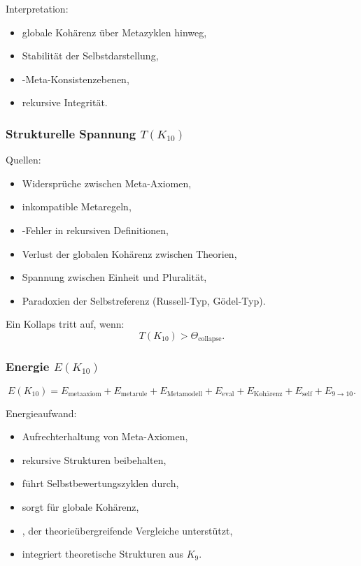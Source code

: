 Interpretation:
\begin{itemize}
    \item globale Kohärenz über Metazyklen hinweg,
    \item Stabilität der Selbstdarstellung,
    \item-Meta-Konsistenzebenen,
    \item rekursive Integrität.
\end{itemize}

\subsubsection{Strukturelle Spannung $T(K_{10})$}

Quellen:
\begin{itemize}
    \item Widersprüche zwischen Meta-Axiomen,
    \item inkompatible Metaregeln,
    \item-Fehler in rekursiven Definitionen,
    \item Verlust der globalen Kohärenz zwischen Theorien,
    \item Spannung zwischen Einheit und Pluralität,
    \item Paradoxien der Selbstreferenz (Russell-Typ, Gödel-Typ).
\end{itemize}

Ein Kollaps tritt auf, wenn:
\[
T(K_{10}) > \Theta_{\mathrm{collapse}}.
\]

\subsubsection{Energie $E(K_{10})$}

\[
E(K_{10})=
E_{\mathrm{metaaxiom}}+
E_{\mathrm{metarule}}+
E_{\mathrm{Metamodell}}+
E_{\mathrm{eval}}+
E_{\mathrm{Kohärenz}}+
E_{\mathrm{self}}+
E_{9\to10}.
\]

Energieaufwand:
\begin{itemize}
    \item Aufrechterhaltung von Meta-Axiomen,
    \item rekursive Strukturen beibehalten,
    \item führt Selbstbewertungszyklen durch,
    \item sorgt für globale Kohärenz,
    \item, der theorieübergreifende Vergleiche unterstützt,
    \item integriert theoretische Strukturen aus $K_9$.
\end{itemize}

